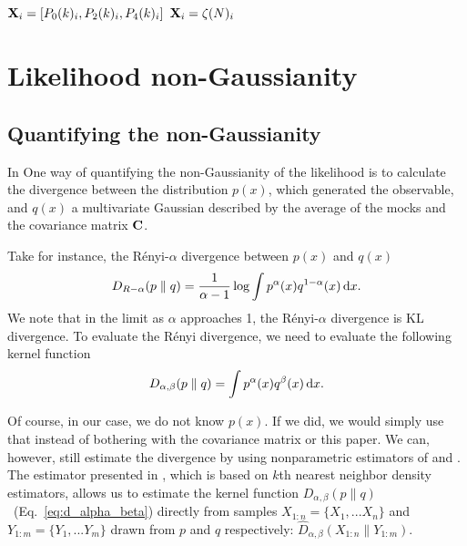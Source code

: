 \documentclass[12pt, letterpaper, preprint]{aastex}
\newcommand{\beq}{\begin{equation}}
\newcommand{\eeq}{\end{equation}}
\begin{document}
\subsection{}
${\bf X}_i = [P_0(k)_i,P_2(k)_i,P_4(k)_i]$
${\bf X}_i = \zeta(N)_i$


\section{Likelihood non-Gaussianity}
\subsection{Quantifying the non-Gaussianity}
In \cite{sellentin2017}
One way of quantifying the non-Gaussianity of the likelihood is to 
calculate the divergence between the distribution $p(x)$, which generated
the observable, and $q(x)$ a multivariate Gaussian described by the average
of the mocks and the covariance matrix ${\bf C}$.

Take for instance, the R\'enyi-$\alpha$ divergence between $p(x)$ and $q(x)$ 
\beq
D_{R-\alpha} ( p \parallel q ) = \frac{1}{\alpha -1} \log \int p^\alpha(x) q^{1 -\alpha}(x)\,{\rm d}x. 
\eeq
We note that in the limit as $\alpha$ approaches 1, the R\'enyi-$\alpha$ 
divergence is KL divergence.
To evaluate the R\'enyi divergence, we need to evaluate the following
kernel function
\beq \label{eq:d_alpha_beta}
D_{\alpha, \beta} ( p \parallel q ) = \int p^\alpha(x) q^\beta(x)\,{\rm d}x. 
\eeq

Of course, in our case, we do not know $p(x)$. If we did, we would simply 
use that instead of bothering with the covariance matrix or this paper. We can,
however, still estimate the divergence by using nonparametric estimators of 
\cite{poczos2012} and \cite{krishnamurthy2014}. The estimator presented in 
\cite{poczos2012}, which is based on $k$th nearest neighbor density estimators, 
allows us to estimate the kernel function $D_{\alpha, \beta}(p \parallel q)$~(Eq.~\ref{eq:d_alpha_beta}) 
directly from samples $X_{1:n} = \{ X_1, ... X_n \}$ and $Y_{1:m} = \{ Y_1, ... Y_m \}$ 
drawn from $p$ and $q$ respectively: $\hat{D}_{\alpha, \beta}(X_{1:n} \parallel Y_{1:m})$. 
\end{document}
